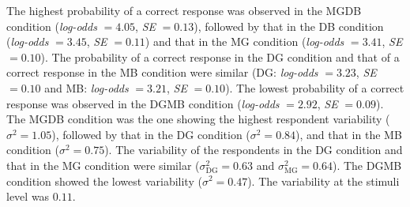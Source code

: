 \documentclass[12pt]{book}
\begin{document}
The highest probability of a correct response was observed in the MGDB condition (\emph{log-odds} $= 4.05$, \emph{SE}  $= 0.13$), followed by that in the DB condition (\emph{log-odds} $= 3.45$, \emph{SE}  $= 0.11$) and that in the MG condition (\emph{log-odds} $= 3.41$, \emph{SE}  $= 0.10$). 
The probability of a correct response in the DG condition and that of a correct response in the MB condition were similar (DG: \emph{log-odds} $= 3.23$, \emph{SE}  $= 0.10$ and MB: \emph{log-odds} $= 3.21$, \emph{SE}  $= 0.10$). The lowest probability of a correct response was observed in the DGMB condition (\emph{log-odds} $= 2.92$, \emph{SE}  $= 0.09$). 
The MGDB condition was the one showing the highest respondent variability ($\sigma^2 = 1.05$), followed by that in the DG condition ($\sigma^2 = 0.84$), and that in the MB condition ($\sigma^2 = 0.75$).
The variability of the respondents in the DG condition and that in the MG condition were similar ($\sigma_{\text{DG}}^2 = 0.63$ and $\sigma_{\text{MG}}^2 = 0.64$). The DGMB condition showed the lowest variability ($\sigma^2 = 0.47$).
The variability at the stimuli level was $0.11$.
\end{document}
